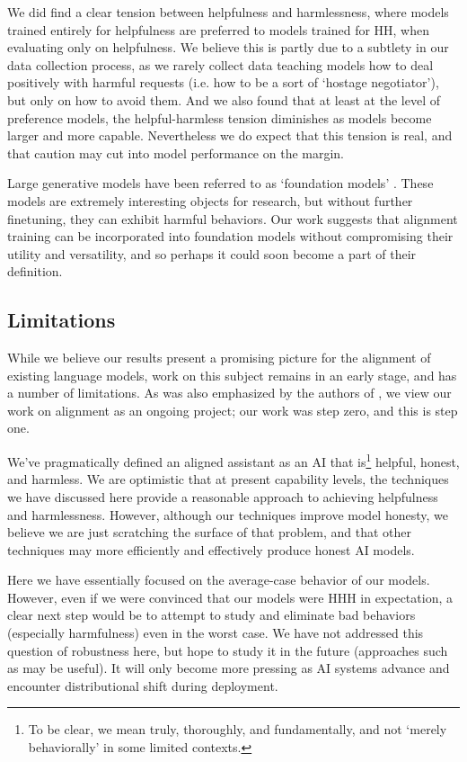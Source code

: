 We did find a clear tension between helpfulness and harmlessness, where models trained entirely for helpfulness are preferred to models trained for HH, when evaluating only on helpfulness.  We believe this is partly due to a subtlety in our data collection process, as we rarely collect data teaching models how to deal positively with harmful requests (i.e. how to be a sort of `hostage negotiator'), but only on how to avoid them. And we also found that at least at the level of preference models, the helpful-harmless tension diminishes as models become larger and more capable.  Nevertheless we do expect that this tension is real, and that caution may cut into model performance on the margin.  

Large generative models have been referred to as `foundation models' \cite{foundationmodels}.  These models are extremely interesting objects for research, but without further finetuning, they can exhibit harmful behaviors.  Our work suggests that alignment training can be incorporated  into foundation models without compromising their utility and versatility, and so perhaps it could soon become a part of their definition.

\subsection{Limitations}

While we believe our results present a promising  picture for the alignment of existing language models, work on this subject remains in an early stage, and has a number of limitations.  As was also emphasized by the authors of \cite{LaMDA}, we view our work on alignment as an ongoing project; our work  \cite{askell2021general} was step zero, and this is step one.

We've pragmatically defined an aligned assistant as an AI that is\footnote{To be clear, we mean truly, thoroughly, and fundamentally, and not `merely behaviorally' in some limited contexts.} helpful, honest, and harmless.  We are optimistic that at present capability levels, the techniques we have discussed here provide a reasonable approach to achieving helpfulness and harmlessness.  However, although our techniques improve model honesty, we believe we are just scratching the surface of that problem, and that other techniques may more efficiently and effectively produce honest AI models.  

Here we have essentially focused on the average-case behavior of our models.  However, even if we were convinced that our models were HHH in expectation, a clear next step would be to attempt to study and eliminate bad behaviors (especially harmfulness) even in the worst case.  We have not addressed this question of robustness here, but hope to study it in the future (approaches such as \cite{DBLP:journals/corr/abs-2202-03286} may be useful).  It will only become more pressing as AI systems advance and encounter distributional shift during deployment.

